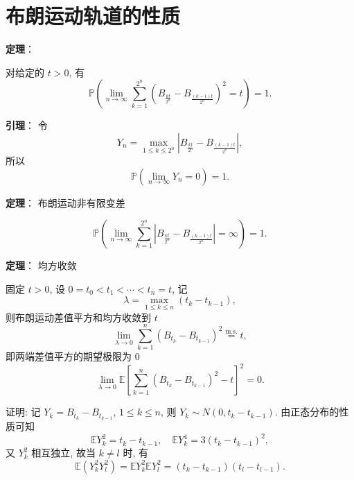 \documentclass[openany]{ctexbook}
\theoremstyle{kaiti}
\theoremstyle{normal}
\begin{document}
\section{布朗运动轨道的性质}

\textbf{定理}：

对给定的 $t>0$, 有
\begin{equation}
  \mathbb{P}\left(\lim_{n\to\infty}\sum_{k=1}^{2^n}\left(B_{\frac{kt}{2^n}}-B_{\frac{(k-1)t}{2^n}}\right)^2=t\right)=1.
\end{equation}

\textbf{引理}：
令 
\begin{equation}
  Y_n=\max_{1\leqslant k\leqslant2^n}\left|B_{\frac{kt}{2^n}}-B_{\frac{(k-1)t}{2^n}}\right|,
\end{equation}
所以
\begin{equation}
  \mathbb{P}\left(\lim_{n\to\infty}Y_n=0\right)=1.
\end{equation}

\textbf{定理}： 布朗运动非有限变差

\begin{equation}
  \mathbb{P}\left(\lim_{n\to\infty}\sum_{k=1}^{2^n}\left|B_{\frac{kt}{2^n}}-B_{\frac{(k-1)t}{2^n}}\right|=\infty\right)=1.
\end{equation}

\textbf{定理}： 均方收敛

固定 $t>0$, 设 $0=t_0<t_1<\cdots<t_n=t$, 记
\begin{equation}
  \lambda=\max_{1\leqslant k\leqslant n}(t_k-t_{k-1}),
\end{equation}
则布朗运动差值平方和均方收敛到 $t$
\begin{equation}
  \lim_{\lambda\to0}\sum_{k=1}^n(B_{t_k}-B_{t_{k-1}})^2\overset{\text{m.s.}}{=}t,
\end{equation}
即两端差值平方的期望极限为 $0$
\begin{equation}
  \lim_{\lambda\to0}\mathbb{E}\left[\sum_{k=1}^n(B_{t_k}-B_{t_{k-1}})^2-t\right]^2=0.
\end{equation}

证明: 记 $Y_k=B_{t_k}-B_{t_{k-1}}$, $1\leqslant k\leqslant n$, 则 $Y_k\sim N(0,t_k-t_{k-1})$. 由正态分布的性质可知
\begin{equation}
  \mathbb{E}Y_k^2=t_k-t_{k-1},\quad \mathbb{E}Y_k^4=3(t_k-t_{k-1})^2,
\end{equation}
又 $Y_k^2$ 相互独立, 故当 $k\neq l$ 时, 有
\begin{equation}
  \mathbb{E}(Y_k^2Y_l^2)=\mathbb{E}Y_k^2\mathbb{E}Y_l^2=(t_k-t_{k-1})(t_l-t_{l-1}).
\end{equation}
\end{document}
